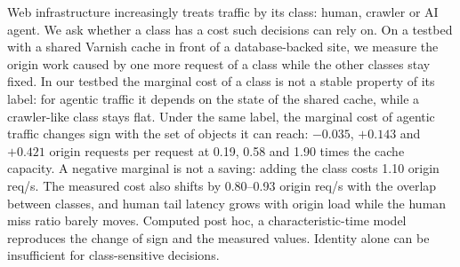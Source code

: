 Web infrastructure increasingly treats traffic by its class: human, crawler or AI agent.
We ask whether a class has a cost such decisions can rely on. On a testbed with a shared
Varnish cache in front of a database-backed site, we measure the origin work caused by one
more request of a class while the other classes stay fixed. In our testbed the marginal
cost of a class is not a stable property of its label: for agentic traffic it depends on
the state of the shared cache, while a crawler-like class stays flat. Under the same label,
the marginal cost of agentic traffic changes sign with the set
of objects it can reach: $-0.035$, $+0.143$ and $+0.421$ origin requests per request at
0.19, 0.58 and 1.90 times the cache capacity. A negative marginal is not a saving: adding
the class costs 1.10 origin req/s. The measured cost also shifts by
0.80--0.93 origin req/s with the overlap between classes, and human tail latency
grows with origin load while the human miss ratio barely moves. Computed post hoc,
a characteristic-time model reproduces the change of sign and the measured values. Identity alone can be insufficient for class-sensitive decisions.
